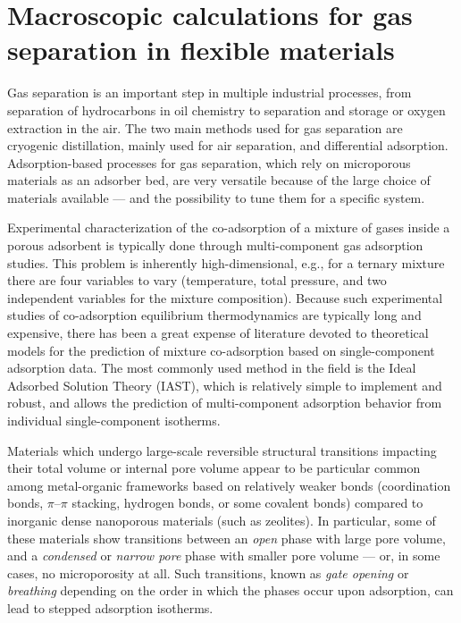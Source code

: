 \documentclass[thesis]{subfiles}
\begin{document}
\section{Macroscopic calculations for gas separation in flexible materials}

Gas separation is an important step in multiple industrial processes, from
separation of hydrocarbons in oil chemistry to  separation and storage
or oxygen extraction in the air. The two main methods used for gas separation
are cryogenic distillation, mainly used for air separation, and differential
adsorption. Adsorption-based processes for gas separation, which rely on
microporous materials as an adsorber bed, are very versatile because of the
large choice of materials available --- and the possibility to tune them for a
specific system.


Experimental characterization of the co-adsorption of a mixture of gases inside
a porous adsorbent is typically done through multi-component gas adsorption
studies. This problem is inherently high-dimensional, e.g., for a ternary
mixture there are four variables to vary (temperature, total pressure, and two
independent variables for the mixture composition). Because such experimental
studies of co-adsorption equilibrium thermodynamics are typically long and
expensive, there has been a great expense of literature devoted to theoretical
models for the prediction of mixture co-adsorption based on single-component
adsorption data. The most commonly used method in the field is the Ideal
Adsorbed Solution Theory (IAST),\cite{Myers1965} which is relatively simple to
implement and robust, and allows the prediction of multi-component adsorption
behavior from individual single-component isotherms.

Materials which undergo large-scale reversible structural transitions impacting
their total volume or internal pore volume appear to be particular common among
metal-organic frameworks based on relatively weaker bonds (coordination bonds,
$\pi$--$\pi$ stacking, hydrogen bonds, or some covalent bonds) compared to
inorganic dense nanoporous materials (such as zeolites). In particular, some of
these materials show transitions between an \emph{open} phase with large pore
volume, and a \emph{condensed} or \emph{narrow pore} phase with smaller pore
volume --- or, in some cases, no microporosity at all. Such transitions, known
as \emph{gate opening}\cite{Kitaura2003, Tanaka2008, Li2015} or
\emph{breathing}\cite{Serre2002} depending on the order in which the phases
occur upon adsorption, can lead to stepped adsorption isotherms.
\end{document}
